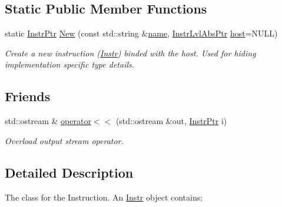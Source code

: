 \subsection*{Static Public Member Functions}
\begin{DoxyCompactItemize}
\item 
\mbox{\label{classilang_1_1_instr_a2890d214caae431fda52808a16d5fba4}} 
static \mbox{\hyperlink{classilang_1_1_instr_af43ebb1fe223b369e42b5600f902b4b4}{Instr\+Ptr}} \mbox{\hyperlink{classilang_1_1_instr_a2890d214caae431fda52808a16d5fba4}{New}} (const std\+::string \&\mbox{\hyperlink{classilang_1_1_object_acf20b072e69f572910d7d80c93af0b38}{name}}, \mbox{\hyperlink{classilang_1_1_instr_ab36b0ed04e0c44e66867ed1d61009f12}{Instr\+Lvl\+Abs\+Ptr}} \mbox{\hyperlink{classilang_1_1_instr_a302d102dcc5e8c47f97f37391d656179}{host}}=N\+U\+LL)
\begin{DoxyCompactList}\small\item\em Create a new instruction (\mbox{\hyperlink{classilang_1_1_instr}{Instr}}) binded with the host. Used for hiding implementation specific type details. \end{DoxyCompactList}\end{DoxyCompactItemize}
\subsection*{Friends}
\begin{DoxyCompactItemize}
\item 
\mbox{\label{classilang_1_1_instr_a8e66ff25b0f41f3a326d1901ed8bd33a}} 
std\+::ostream \& \mbox{\hyperlink{classilang_1_1_instr_a8e66ff25b0f41f3a326d1901ed8bd33a}{operator$<$$<$}} (std\+::ostream \&out, \mbox{\hyperlink{classilang_1_1_instr_af43ebb1fe223b369e42b5600f902b4b4}{Instr\+Ptr}} i)
\begin{DoxyCompactList}\small\item\em Overload output stream operator. \end{DoxyCompactList}\end{DoxyCompactItemize}


\subsection{Detailed Description}
The class for the Instruction. An \mbox{\hyperlink{classilang_1_1_instr}{Instr}} object contains\+: 


